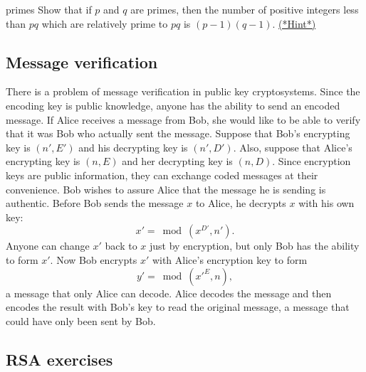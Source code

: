  
 
\begin{exercise}{primes}
Show that if $p$ and $q$ are primes, then the number of positive integers less than $pq$ which are relatively prime to $pq$ is $(p-1)(q-1)$.
\hyperref[sec:Cryptography:Hints]{(*Hint*)}
\end{exercise}
 
\subsection{Message verification}
\label{subsec:Cryptography:PublicKey:MessageVerification}
 
 
There is a problem of message verification in public key
cryptosystems. Since the encoding key is public knowledge, anyone has
the ability to send an encoded message.  If Alice receives a message
from Bob, she would like to be able to verify that it was Bob who
actually sent the message. Suppose that Bob's encrypting key is $(n',
E')$ and his decrypting key is $(n', D')$.  Also, suppose that Alice's
encrypting key is $(n, E)$ and her decrypting key is $(n, D)$.  Since
encryption keys are public information, they can exchange coded
messages at their convenience.  Bob wishes to assure Alice that the
message he is sending is authentic. Before Bob sends the message $x$
to Alice, he decrypts  $x$ with his own key:
$$
x' =  \bmod(x ^{D'}, n').
$$
Anyone can change $x'$ back to $x$ just by encryption, but only Bob
has the ability to form $x'$. Now Bob encrypts $x'$ with Alice's
encryption key to form 
$$
y' = \bmod({x'}^E,   n),
$$
a message that only Alice can decode.  Alice decodes the message and
then encodes the result with Bob's key to read the original message, a
message that could have only been sent by Bob.
 

\subsection{RSA exercises\quad
{}}
 \label{subsec:Cryptography:PublicKey:RSAExercises}

